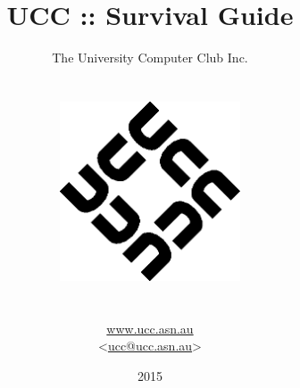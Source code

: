 \begin{titlepage}


\title{UCC :: Survival Guide}
\author{The University Computer Club Inc. \\ \\ \\
	\includegraphics[width=0.4\textwidth]{figures/ucc-logo.png} \\  \\ \\ %
	\url{www.ucc.asn.au} \\ <\href{mailto:ucc@ucc.asn.au}{ucc@ucc.asn.au}> \\
}

\date{2015}



\maketitle
\centering



\end{titlepage}
